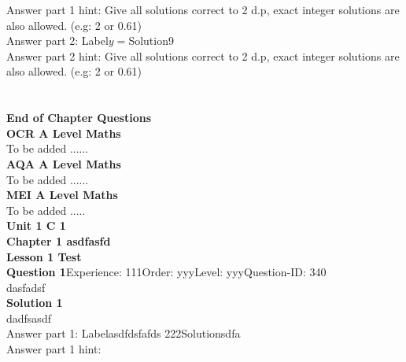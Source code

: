 \documentclass{article}
\begin{document}
Answer part 1 hint: \hspace{15pt}Give all solutions correct to 2 d.p, exact integer solutions are also allowed. (e.g: 2 or 0.61)\\
Answer part 2: \hspace{10pt}Label\hspace{10pt}$y=$\hspace{10pt}Solution\hspace{10pt}9\\
Answer part 2 hint: \hspace{15pt}Give all solutions correct to 2 d.p, exact integer solutions are also allowed. (e.g: 2 or 0.61)\\
\\[4pt]
\\[2pt]
\noindent\large{\textbf{End of Chapter Questions}}\\[15pt]
\noindent\Huge{\textbf{OCR A Level Maths}}\\[5pt]
\noindent\large{To be added ......}\\[20pt]
\noindent\Huge{\textbf{AQA A Level Maths}}\\[5pt]
\noindent\large{To be added ......}\\[20pt]
\noindent\Huge{\textbf{MEI A Level Maths}}\\[5pt]
\noindent\large{To be added .....}\\[20pt]
\noindent\huge{\textbf{Unit 1 C 1}}\\[18pt]
\noindent\huge{\textbf{Chapter 1 asdfasfd}}\\[15pt]
\noindent\huge{\textbf{Lesson 1 Test }}\\[12pt]
\noindent\textbf{Question 1}\hspace{20pt}Experience: 111\hspace{20pt}Order: yyy\hspace{20pt}Level: yyy\hspace{20pt}Question-ID: 340\\[2pt]
dasfadsf\\[4pt]
\noindent\textbf{Solution 1}\\[2pt]
dadfsasdf\\[4pt]
Answer part 1: \hspace{10pt}Label\hspace{10pt}asdfdsfafds  222\hspace{10pt}Solution\hspace{10pt}sdfa\\
Answer part 1 hint: \hspace{15pt}\\
\end{document}
